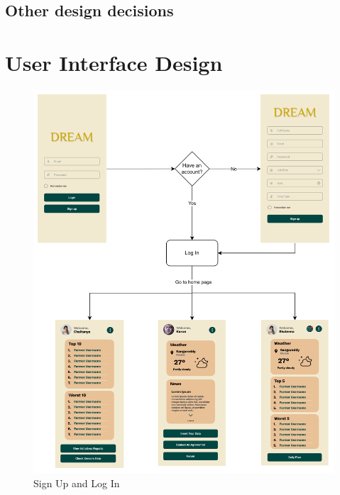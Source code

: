 \documentclass[table, 12pt]{article}
\begin{document}
\subsection{Other design decisions}

\newpage
\section{User Interface Design}
\begin{center}
    \begin{figure}[H]
        \includegraphics[scale=0.74, center]{assets/MockUp/SignUpandLogin.png}
        \caption{Sign Up and Log In}
        \label{fig: signMockup}
    \end{figure}
\end{center}
\end{document}
